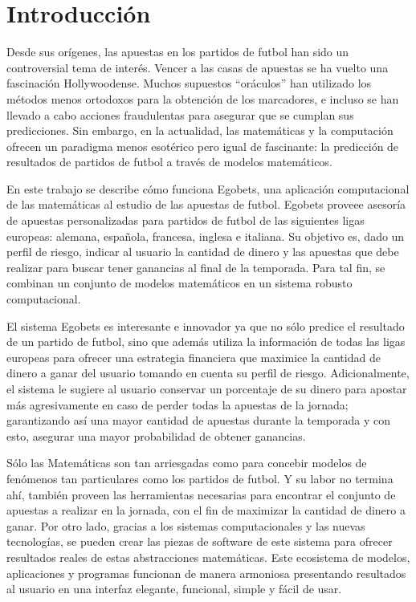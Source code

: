 \chapter{Introducción}

Desde sus orígenes, las apuestas en los partidos de futbol han sido un controversial tema de interés. Vencer a las casas de apuestas se ha vuelto una fascinación Hollywoodense. Muchos supuestos ``oráculos'' han utilizado los métodos menos ortodoxos para la obtención de los marcadores, e incluso se han llevado a cabo acciones fraudulentas para asegurar que se cumplan sus predicciones. Sin embargo, en la actualidad, las matemáticas y la computación ofrecen un paradigma menos esotérico pero igual de fascinante: la predicción de resultados de partidos de futbol a través de modelos matemáticos.

En este trabajo se describe cómo funciona Egobets, una aplicación computacional de las matemáticas al estudio de las apuestas de futbol. Egobets proveee asesoría de apuestas personalizadas para partidos de futbol de las siguientes ligas europeas: alemana, española, francesa, inglesa e italiana. Su objetivo es, dado un perfil de riesgo, indicar al usuario la cantidad de dinero y las apuestas que debe realizar para buscar tener ganancias al final de la temporada. Para tal fin, se combinan un conjunto de modelos matemáticos en un sistema robusto computacional.

El sistema Egobets es interesante e innovador ya que no sólo predice el resultado de un partido de futbol, sino que además utiliza la información de todas las ligas europeas para ofrecer una estrategia financiera que maximice la cantidad de dinero a ganar del usuario tomando en cuenta su perfil de riesgo. Adicionalmente, el sistema le sugiere al usuario conservar un porcentaje de su dinero para apostar más agresivamente en caso de perder todas la apuestas de la jornada; garantizando así una mayor cantidad de apuestas durante la temporada y con esto, asegurar una mayor probabilidad de obtener ganancias.

Sólo las Matemáticas son tan arriesgadas como para concebir modelos de fenómenos tan particulares como los partidos de futbol. Y su labor no termina ahí, también proveen las herramientas necesarias para encontrar el conjunto de apuestas a realizar en la jornada, con el fin de maximizar la cantidad de dinero a ganar. Por otro lado, gracias a los sistemas computacionales y las nuevas tecnologías, se pueden crear las piezas de software de este sistema para ofrecer resultados reales de estas abstracciones matemáticas. Este ecosistema de modelos, aplicaciones y programas funcionan de manera armoniosa presentando resultados al usuario en una interfaz elegante, funcional, simple y fácil de usar. 

